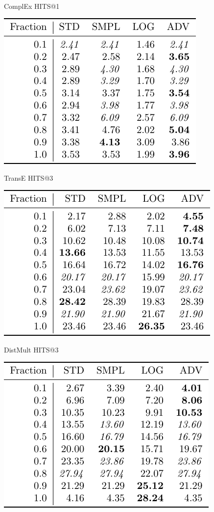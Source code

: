 \documentclass{article}
\begin{document}
\begin{figure}
\caption{ComplEx HITS@1}
\end{figure}\begin{figure}
\includegraphics[]{results_TransE_HITS@3}\\
\caption{TransE HITS@3}
\end{figure}\begin{figure}
\includegraphics[]{results_DistMult_HITS@3}\\
\caption{DistMult HITS@3}
\end{figure}\begin{figure}
\includegraphics[]{results_ComplEx_HITS@3}\\

\end{figure}
\end{document}
